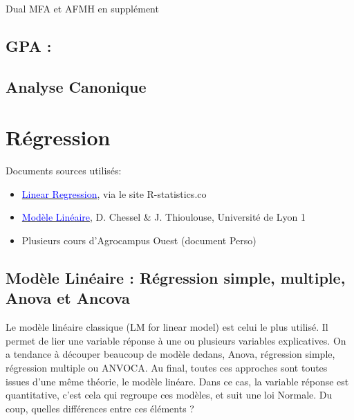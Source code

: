 \documentclass[
]{article}
\begin{document}
Dual MFA et AFMH en supplément

\hypertarget{gpa}{%
\subsection{GPA :}\label{gpa}}

\hypertarget{analyse-canonique}{%
\subsection{Analyse Canonique}\label{analyse-canonique}}

\pagebreak

\hypertarget{ruxe9gression}{%
\section{Régression}\label{ruxe9gression}}

Documents sources utilisés:

\begin{itemize}
\item
  \href{http://r-statistics.co/Linear-Regression.html}{\textcolor{blue}{Linear Regression}},
  via le site R-statistics.co
\item
  \href{https://pbil.univ-lyon1.fr/R/pdf/br4.pdf}{\textcolor{blue}{Modèle Linéaire}},
  D. Chessel \& J. Thioulouse, Université de Lyon 1
\item
  Plusieurs cours d'Agrocampus Ouest (document Perso)
\end{itemize}

\hypertarget{moduxe8le-linuxe9aire-ruxe9gression-simple-multiple-anova-et-ancova}{%
\subsection{Modèle Linéaire : Régression simple, multiple, Anova et
Ancova}\label{moduxe8le-linuxe9aire-ruxe9gression-simple-multiple-anova-et-ancova}}

Le modèle linéaire classique (LM for linear model) est celui le plus
utilisé. Il permet de lier une variable réponse à une ou plusieurs
variables explicatives. On a tendance à découper beaucoup de modèle
dedans, Anova, régression simple, régression multiple ou ANVOCA. Au
final, toutes ces approches sont toutes issues d'une même théorie, le
modèle linéare. Dans ce cas, la variable réponse est quantitative, c'est
cela qui regroupe ces modèles, et suit une loi Normale. Du coup, quelles
différences entre ces éléments ?
\end{document}
